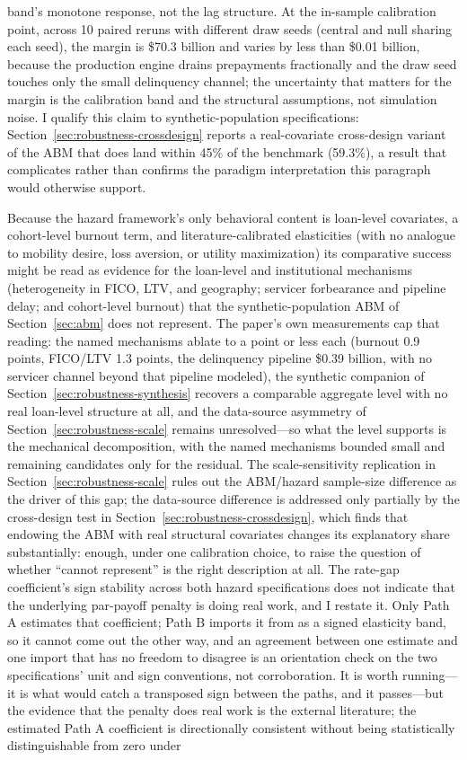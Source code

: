 \documentclass[12pt]{article}
\begin{document}
band's monotone response, not the lag structure. At the in-sample calibration point, across 10 paired reruns with different draw seeds (central and null sharing each seed), the margin is \$70.3 billion and varies by less than \$0.01 billion, because the production engine drains prepayments fractionally and the draw seed touches only the small delinquency channel; the uncertainty that matters for the margin is the calibration band and the structural assumptions, not simulation noise. I qualify this claim to synthetic-population specifications: Section~\ref{sec:robustness-crossdesign} reports a real-covariate cross-design variant of the ABM that does land within 45\% of the benchmark (59.3\%), a result that complicates rather than confirms the paradigm interpretation this paragraph would otherwise support.

Because the hazard framework's only behavioral content is loan-level covariates, a cohort-level burnout term, and literature-calibrated elasticities (with no analogue to mobility desire, loss aversion, or utility maximization) its comparative success might be read as evidence for the loan-level and institutional mechanisms (heterogeneity in FICO, LTV, and geography; servicer forbearance and pipeline delay; and cohort-level burnout) that the synthetic-population ABM of Section~\ref{sec:abm} does not represent. The paper's own measurements cap that reading: the named mechanisms ablate to a point or less each (burnout 0.9 points, FICO/LTV 1.3 points, the delinquency pipeline \$0.39 billion, with no servicer channel beyond that pipeline modeled), the synthetic companion of Section~\ref{sec:robustness-synthesis} recovers a comparable aggregate level with no real loan-level structure at all, and the data-source asymmetry of Section~\ref{sec:robustness-scale} remains unresolved---so what the level supports is the mechanical decomposition, with the named mechanisms bounded small and remaining candidates only for the residual. The scale-sensitivity replication in Section~\ref{sec:robustness-scale} rules out the ABM/hazard sample-size difference as the driver of this gap; the data-source difference is addressed only partially by the cross-design test in Section~\ref{sec:robustness-crossdesign}, which finds that endowing the ABM with real structural covariates changes its explanatory share substantially: enough, under one calibration choice, to raise the question of whether ``cannot represent'' is the right description at all. The rate-gap coefficient's sign stability across both hazard specifications does not indicate that the underlying par-payoff penalty is doing real work, and I restate it. Only Path A estimates that coefficient; Path B imports it from \citet{liebersohn2024} as a signed elasticity band, so it cannot come out the other way, and an agreement between one estimate and one import that has no freedom to disagree is an orientation check on the two specifications' unit and sign conventions, not corroboration. It is worth running---it is what would catch a transposed sign between the paths, and it passes---but the evidence that the penalty does real work is the external literature; the estimated Path A coefficient is directionally consistent without being statistically distinguishable from zero under 
\end{document}
